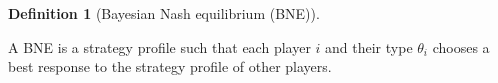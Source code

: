 \documentclass[
]{article}
\theoremstyle{plain}
\theoremstyle{definition}
\newtheorem{definition}{Definition}[section]
\theoremstyle{remark}
\begin{document}
\begin{definition}[Bayesian Nash equilibrium
(BNE)]\protect\hypertarget{def-BNE}{}\label{def-BNE}

A BNE is a strategy profile such that each player \(i\) and their type
\(\theta_i\) chooses a best response to the strategy profile of other
players.

\end{definition}
\end{document}
